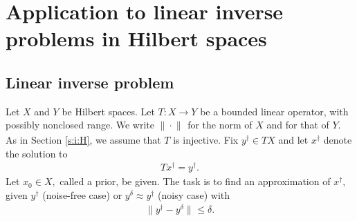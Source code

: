 \documentclass[10pt, a4paper]{iopart}
\newcommand{\IX}{\mathbb{X}}
\newcommand{\norm}[2]{     \| #1       \|_{ #2 }}
\newcommand{\scalar}[2]{     \langle #1       \rangle_{ #2 }}
\theoremstyle{remark}
\theoremstyle{definition}
\newcommand{\TODO}[1]{\textrm{\color{red}TODO: #1}}
\begin{document}
%





%

\section{Application to linear inverse problems in Hilbert spaces}
\label{s:ip}

\subsection{Linear inverse problem}
\label{s:ip:0}

Let $X$ and $Y$ be Hilbert spaces.
%
Let $T : X \to Y$ be a bounded linear operator,
with possibly nonclosed range.
%
We write $\norm{\cdot}{}$ for the norm of $X$ and for that of $Y$.
%
As in Section \ref{s:i:H},
we assume that $T$ is injective.
%
Fix $y^\dag \in T X$ and 
let $x^\dag$ denote the solution to
\begin{align}
\label{e:Tx=y}
	T x^\dag = y^\dag
	.
\end{align}
%
Let
$ %
	x_0 \in X,
$ %
called a prior,
be given.
%
%
%
The task is to find an approximation of $x^\dag$,
given $y^\dag$ (noise-free case)
or $y^\delta \approx y^\dag$ (noisy case)
with
\begin{align}
\label{e:ydel}
	\norm{ y^\dag - y^\delta }{}
	\leq
	\delta
	.
\end{align}
\end{document}
